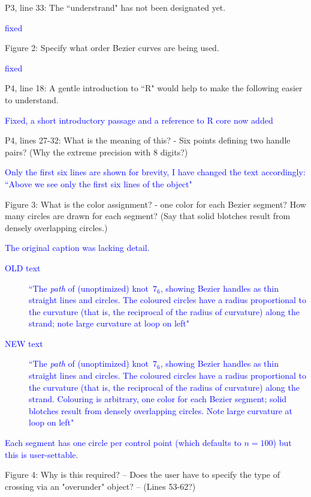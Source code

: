 \documentclass[12pt]{article}
\begin{document}
P3, line 33:  The ``understrand" has not been designated yet.

\textcolor{blue}{fixed}%

Figure 2:  Specify what order Bezier curves are being used.

\textcolor{blue}{fixed}%

P4, line 18: A gentle introduction to ``R" would help to make the
following easier to understand.

\textcolor{blue}{Fixed, a short introductory passage and a reference
  to R core now added}%

P4, lines 27-32: What is the meaning of this? - Six points defining
two handle pairs?  (Why the extreme precision with 8 digits?)

\textcolor{blue}{Only the first six lines are shown for brevity, I have
  changed the text accordingly: ``Above we see only the first six lines
of the object"}


Figure 3: What is the color assignment? - one color for each Bezier
segment?  How many circles are drawn for each segment?  (Say that
solid blotches result from densely overlapping circles.)

\textcolor{blue}{The original caption was lacking detail.
  \begin{description}
  \item[OLD text] ``The \emph{path} of (unoptimized) knot~$7_6$,
    showing Bezier handles as thin straight lines and circles.  The
    coloured circles have a radius proportional to the curvature (that
    is, the reciprocal of the radius of curvature) along the strand;
    note large curvature at loop on left"
  \item[NEW text] ``The \emph{path} of (unoptimized) knot~$7_6$,
    showing Bezier handles as thin straight lines and circles.  The
    coloured circles have a radius proportional to the curvature (that
    is, the reciprocal of the radius of curvature) along the strand.
    Colouring is arbitrary, one color for each Bezier segment; solid
    blotches result from densely overlapping circles.  Note large
    curvature at loop on left"
  \end{description}
  Each segment has one circle per control point (which defaults to
  $n=100$) but this is user-settable.
}



Figure 4: Why is this required?  -- Does the user have to specify the
type of crossing via an "overunder" object?  -- (Lines 53-62?)%
\end{document}
